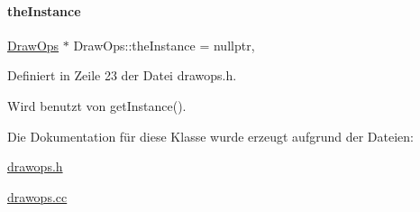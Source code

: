 \paragraph{\texorpdfstring{the\+Instance}{theInstance}}
{\footnotesize\ttfamily \mbox{\hyperlink{classDrawOps}{Draw\+Ops}} $\ast$ Draw\+Ops\+::the\+Instance = nullptr\hspace{0.3cm}{\ttfamily [static]}, {\ttfamily [private]}}



Definiert in Zeile 23 der Datei drawops.\+h.



Wird benutzt von get\+Instance().



Die Dokumentation für diese Klasse wurde erzeugt aufgrund der Dateien\+:\begin{DoxyCompactItemize}
\item 
\mbox{\hyperlink{drawops_8h}{drawops.\+h}}\item 
\mbox{\hyperlink{drawops_8cc}{drawops.\+cc}}\end{DoxyCompactItemize}
